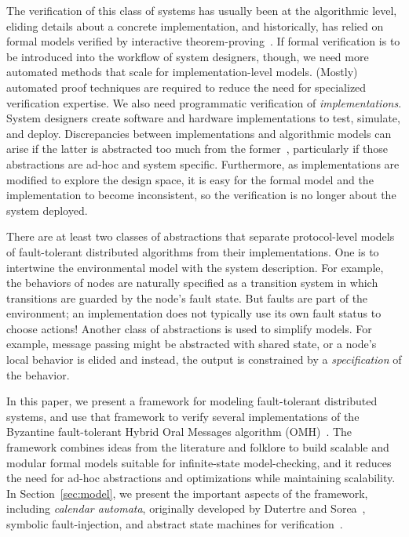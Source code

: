 \documentclass{llncs/llncs}
\newcommand{\OMH}{\ensuremath{\mathrm{OMH}}\xspace}
\begin{document}
The verification of this class of systems has usually been at the algorithmic level, eliding details about a concrete implementation, and historically, has relied on formal models verified by interactive theorem-proving~\cite{om-acl2-impl,Young97:IC,Lincoln-Rushby,pvs}. If formal verification is to be introduced into the workflow of system designers, though, we need more automated methods that scale for implementation-level models. (Mostly) automated proof techniques are required to reduce the need for specialized verification expertise. We also need programmatic verification of \emph{implementations}. System designers create software and hardware implementations to test, simulate, and deploy. Discrepancies between implementations and algorithmic models can arise if the latter is abstracted too much from the former~\cite{paxos}, particularly if those abstractions are ad-hoc and system specific. Furthermore, as implementations are modified to explore the design space, it is easy for the formal model and the implementation to become inconsistent, so the verification is no longer about the system deployed.

There are at least two classes of abstractions that separate protocol-level models of fault-tolerant distributed algorithms from their implementations.  One is to intertwine the environmental model with the system description. For example, the behaviors of nodes are naturally specified as a transition system in which transitions are guarded by the node's fault state. But faults are part of the environment; an implementation does not typically use its own fault status to choose actions! Another class of abstractions is used to simplify models.  For example, message passing might be abstracted with shared state, or a node's local behavior is elided and instead, the output is constrained by a \emph{specification} of the behavior.

In this paper, we present a framework for modeling fault-tolerant distributed systems, and use that framework to verify several implementations of the Byzantine fault-tolerant Hybrid Oral Messages algorithm (\OMH)~\cite{Lincoln-Rushby}. The framework combines ideas from the literature and folklore to build scalable and modular formal models suitable for infinite-state model-checking, and it reduces the need for ad-hoc abstractions and optimizations while maintaining scalability. In Section~\ref{sec:model}, we present the important aspects of the framework, including \emph{calendar automata}, originally developed by Dutertre and Sorea~\cite{cal}, symbolic fault-injection, and abstract state machines for verification~\cite{}.
\end{document}
